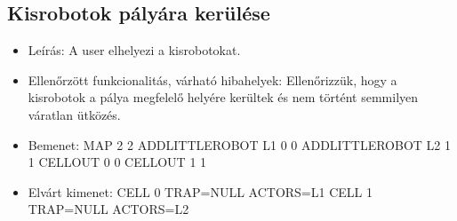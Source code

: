 \subsection{Kisrobotok pályára kerülése}
\begin{itemize}
\item Leírás: \newline
A user elhelyezi a kisrobotokat.
\item Ellenőrzött funkcionalitás, várható hibahelyek: \newline
Ellenőrizzük, hogy a kisrobotok a pálya megfelelő helyére kerültek és nem történt semmilyen váratlan ütközés.
\item Bemenet: \newline
MAP 2 2
ADDLITTLEROBOT L1 0 0 \newline
ADDLITTLEROBOT L2 1 1 \newline
CELLOUT 0 0 \newline
CELLOUT 1 1 \newline
\item Elvárt kimenet: \newline
CELL 0 TRAP=NULL ACTORS=L1
CELL 1 TRAP=NULL ACTORS=L2
\end{itemize}


